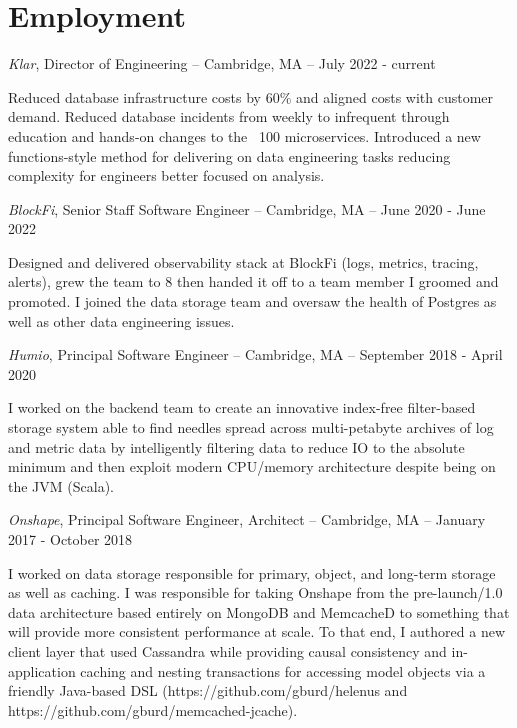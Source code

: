 \documentclass[letterpaper]{article}
\renewenvironment{itemize}{
  \begin{list}{}{
    \setlength{\leftmargin}{1.5em}
  }
}{
  \end{list}
}
\begin{document}
\section*{Employment}

\begin{itemize}

\item {\it Klar}, Director of Engineering -- Cambridge, MA -- July 2022 - current

Reduced database infrastructure costs by 60\% and aligned costs with customer demand. Reduced database incidents from weekly to infrequent through education and hands-on changes to the ~100 microservices.  Introduced a new functions-style method for delivering on data engineering tasks reducing complexity for engineers better focused on analysis.

\item {\it BlockFi}, Senior Staff Software Engineer -- Cambridge, MA -- June 2020 - June 2022

Designed and delivered observability stack at BlockFi (logs, metrics, tracing, alerts), grew the team to 8 then handed it off to a team member I groomed and promoted. I joined the data storage team and oversaw the health of Postgres as well as other data engineering issues.

\item {\it Humio}, Principal Software Engineer -- Cambridge, MA -- September 2018 - April 2020

I worked on the backend team to create an innovative index-free filter-based storage system able to find needles spread across multi-petabyte archives of log and metric data by intelligently filtering data to reduce IO to the absolute minimum and then exploit modern CPU/memory architecture despite being on the JVM (Scala).

\item {\it Onshape}, Principal Software Engineer, Architect -- Cambridge, MA -- January 2017 - October 2018

I worked on data storage responsible for primary, object, and long-term storage as well as caching.  I was responsible for taking Onshape from the pre-launch/1.0 data architecture based entirely on MongoDB and MemcacheD to something that will provide more consistent performance at scale.  To that end, I authored a new client layer that used Cassandra while providing causal consistency and in-application caching and nesting transactions for accessing model objects via a friendly Java-based DSL (https://github.com/gburd/helenus and https://github.com/gburd/memcached-jcache).


\end{itemize}
\end{document}
